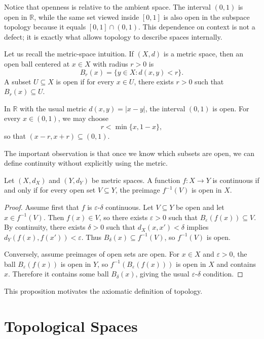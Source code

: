 Notice that openness is relative to the ambient space. The interval $(0,1)$ is open in $\mathbb{R}$, while the same set viewed inside $[0,1]$ is also open in the subspace topology because it equals $[0,1]\cap (0,1)$. This dependence on context is not a defect; it is exactly what allows topology to describe spaces internally.

Let us recall the metric-space intuition. If $(X,d)$ is a metric space, then an open ball centered at $x\in X$ with radius $r>0$ is
\[
    B_r(x)=\{y\in X:d(x,y)<r\}.
\]
A subset $U\subseteq X$ is open if for every $x\in U$, there exists $r>0$ such that $B_r(x)\subseteq U$.

\begin{example}
In $\mathbb{R}$ with the usual metric $d(x,y)=|x-y|$, the interval $(0,1)$ is open. For every $x\in(0,1)$, we may choose
\[
    r<\min\{x,1-x\},
\]
so that $(x-r,x+r)\subseteq(0,1)$.
\end{example}

The important observation is that once we know which subsets are open, we can define continuity without explicitly using the metric.

\begin{proposition}
Let $(X,d_X)$ and $(Y,d_Y)$ be metric spaces. A function $f:X\to Y$ is continuous if and only if for every open set $V\subseteq Y$, the preimage $f^{-1}(V)$ is open in $X$.
\end{proposition}

\begin{proof}
Assume first that $f$ is $\varepsilon$-$\delta$ continuous. Let $V\subseteq Y$ be open and let $x\in f^{-1}(V)$. Then $f(x)\in V$, so there exists $\varepsilon>0$ such that $B_\varepsilon(f(x))\subseteq V$. By continuity, there exists $\delta>0$ such that $d_X(x,x')<\delta$ implies $d_Y(f(x),f(x'))<\varepsilon$. Thus $B_\delta(x)\subseteq f^{-1}(V)$, so $f^{-1}(V)$ is open.

Conversely, assume preimages of open sets are open. For $x\in X$ and $\varepsilon>0$, the ball $B_\varepsilon(f(x))$ is open in $Y$, so $f^{-1}(B_\varepsilon(f(x)))$ is open in $X$ and contains $x$. Therefore it contains some ball $B_\delta(x)$, giving the usual $\varepsilon$-$\delta$ condition.
\end{proof}

This proposition motivates the axiomatic definition of topology.

\section{Topological Spaces}

